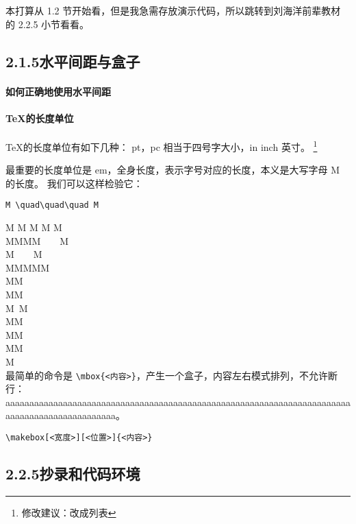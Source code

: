 \documentclass[UTF8]{ctexart} %
\begin{document}
本打算从 1.2 节开始看，但是我急需存放演示代码，所以跳转到刘海洋前辈教材 \cite{刘海洋2013latex} 的 2.2.5 小节看看。


\subsection{2.1.5水平间距与盒子}%
\label{sub:2.1.5水平间距与盒子}

\paragraph{如何正确地使用水平间距}%
\label{par:如何正确地使用水平间距}

\paragraph{TeX的长度单位}%
\label{par:TeX的长度单位}

\TeX 的长度单位有如下几种：
pt，pc 相当于四号字大小，in inch 英寸。
\footnote{修改建议：改成列表}

最重要的长度单位是 em，全身长度，表示字号对应的长度，本义是大写字母 M 的长度。
我们可以这样检验它：
\begin{verbatim}
M \quad\quad\quad M
\end{verbatim}
M M M M M\\
MMMM~~~~M\\
M~\quad~\quad~\quad~M\\
MMMMM\\
M\quad\quad\quad{\!}M\\
M\quad\quad{\quad}M\\
M\quad\quad\quad~M\\
M\quad\quad\quad{\enskip}M\\
M\quad\quad\quad\!M\\
M\quad\quad\quad{\,}M\\
M\qquad{}\\

最简单的命令是 \verb|\mbox{<内容>}|，产生一个盒子，内容左右模式排列，不允许断行：
\mbox{aaaaaaaaaaaaaaaaaaaaaaaaaaaaaaaaaaaaaaaaaaaaaaaaaaaaaaaaaaaaaaaaaaaaaaaaaaaaaaaaaaaaaaaaaaaaaaa}。

\begin{verbatim}
\makebox[<宽度>][<位置>]{<内容>}
\end{verbatim}


\subsection{2.2.5抄录和代码环境}%
\label{sub:2.2.5抄录和代码环境}
\end{document}
